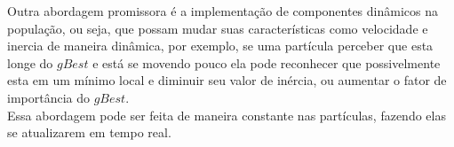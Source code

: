             Outra abordagem promissora é a implementação de componentes dinâmicos na população, ou seja, que possam mudar suas características como velocidade e inercia de maneira dinâmica, por exemplo, se uma partícula perceber que esta longe do $gBest$ e está se movendo pouco ela pode reconhecer que possivelmente esta em um mínimo local e diminuir seu valor de inércia, ou aumentar o fator de importância do $gBest$.\\
            Essa abordagem pode ser feita de maneira constante nas partículas, fazendo elas se atualizarem em tempo real.

